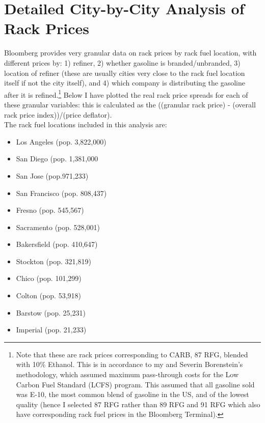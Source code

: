 \documentclass{article}
\begin{document}
\section{Detailed City-by-City Analysis of Rack Prices}
Bloomberg provides very granular data on rack prices by rack fuel location, with different prices by: 1) refiner, 2) whether gasoline is branded/unbranded, 3) location of refiner (these are usually cities very close to the rack fuel location itself if not the city itself), and 4) which company is distributing the gasoline after it is refined.\footnote{Note that these are rack prices corresponding to CARB, 87 RFG, blended with 10\% Ethanol. This is in accordance to my and Severin Borenstein's methodology, which assumed maximum pass-through costs for the Low Carbon Fuel Standard (LCFS) program. This assumed that all gasoline sold was E-10, the most common blend of gasoline in the US, and of the lowest quality (hence I selected 87 RFG rather than 89 RFG and 91 RFG which also have corresponding rack fuel prices in the Bloomberg Terminal).} Below I have plotted the real rack price spreads for each of these granular variables: this is calculated as the ((granular rack price) - (overall rack price index))/(price deflator). \\
The rack fuel locations included in this analysis are: 
\begin{itemize} 
	\item Los Angeles (pop. 3,822,000)
	\item San Diego (pop. 1,381,000
	\item San Jose (pop.971,233)
	\item San Francisco (pop. 808,437)
	\item Fresno (pop. 545,567)
	\item Sacramento (pop. 528,001)
	\item Bakersfield (pop. 410,647)
	\item Stockton (pop. 321,819)
	\item Chico (pop. 101,299)
	\item Colton (pop. 53,918)
	\item Barstow (pop. 25,231)
	\item Imperial (pop. 21,233)
\end{itemize}
\end{document}
